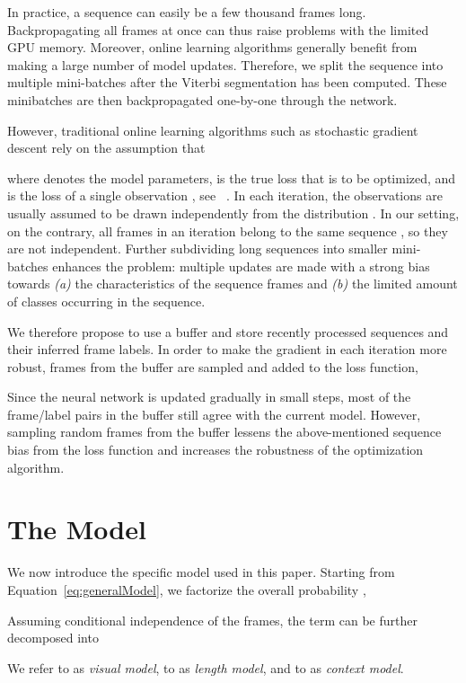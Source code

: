 \documentclass[10pt,twocolumn,letterpaper]{article}
\begin{document}
In practice, a sequence  can easily be a few thousand frames long.
Backpropagating all frames at once can thus raise problems with the limited GPU memory.
Moreover, online learning algorithms generally benefit from making a large number of model
updates. Therefore, we split the sequence into multiple mini-batches after the Viterbi segmentation
 has been computed. These minibatches are then backpropagated
one-by-one through the network.

However, traditional online learning algorithms such as stochastic gradient descent rely on
the assumption that

where  denotes the model parameters,  is the true loss
that is to be optimized, and  is the loss of a single observation ,
see \eg~\cite{bottou1998online}.
In each iteration, the observations  are usually assumed to be drawn independently
from the distribution . In our setting, on the contrary, all frames in
an iteration belong to the same sequence , so they are
not independent. Further subdividing long sequences into smaller mini-batches
enhances the problem: multiple updates are made with a strong bias towards \textit{(a)}
the characteristics of the sequence frames and \textit{(b)} the limited amount of
classes occurring in the sequence.

We therefore propose to use a buffer  and store recently processed sequences
and their inferred frame labels. In order to make the gradient in each iteration
more robust,  frames from the buffer are sampled and added to the loss function,

Since the neural network is updated gradually in small steps, most of the frame/label pairs
in the buffer still agree with the current model. However, sampling random frames from
the buffer lessens the above-mentioned sequence bias from the loss function and
increases the robustness of the optimization algorithm.



\section{The Model}
\label{sec:model}

We now introduce the specific model used in this paper. Starting from Equation~\eqref{eq:generalModel},
we factorize the overall probability ,

Assuming conditional independence of the frames, the  term can be further decomposed into

We refer to  as \textit{visual model}, to  as
\textit{length model}, and to  as \textit{context model}.
\end{document}
